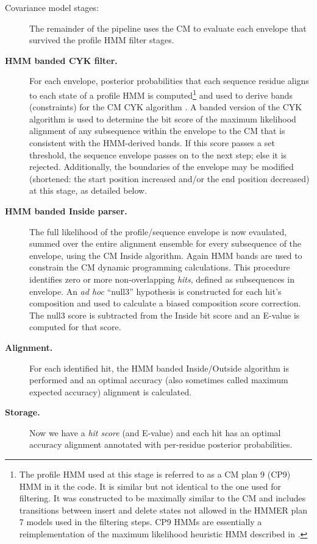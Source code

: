 \begin{description}
\begin{description}
\end{description}

\item[Covariance model stages:] The remainder of the pipeline uses the
  CM to evaluate each envelope that survived the profile HMM filter
  stages.

\item[\textbf{HMM banded CYK filter.}] For each envelope, posterior
  probabilities that each sequence residue aligns to each state of a
  profile HMM is computed\footnote{The profile HMM used at this stage
  is referred to as a CM plan 9 (CP9) HMM in it the code. It is
  similar but not identical to the one used for filtering. It was
  constructed to be maximally similar to the CM and includes
  transitions between insert and delete states not allowed in the
  HMMER plan 7 models used in the filtering steps. CP9 HMMs are
  essentially a reimplementation of the maximum likelihood heuristic
  HMM described in \cite{WeinbergRuzzo06}.} and used to derive bands
  (constraints) for the CM CYK algorithm \cite{Brown00,
  Nawrocki09}. A banded version of the CYK algorithm is used to
  determine the bit score of the maximum likelihood alignment of any
  subsequence within the envelope to the CM that is consistent with
  the HMM-derived bands. If this score passes a set threshold, the
  sequence envelope passes on to the next step; else it is rejected. 
  Additionally, the boundaries of the envelope may be modified
  (shortened: the start position increased and/or the end position
  decreased) at this stage, as detailed below.

\item[\textbf{HMM banded Inside parser.}] The full likelihood of the
  profile/sequence envelope is now evaulated, summed over the entire
  alignment ensemble for every subsequence of the envelope, using the
  CM Inside algorithm. Again HMM bands are used to constrain the
  CM dynamic programming calculations. This procedure identifies zero
  or more non-overlapping \emph{hits}, defined as subsequences in
  envelope. An \emph{ad hoc} ``null3'' hypothesis is constructed for
  each hit's composition and used to calculate a biased composition
  score correction. The null3 score is subtracted from the Inside bit
  score and an E-value is computed for that score.

\item[\textbf{Alignment.}] For each identified hit, the HMM banded
  Inside/Outside algorithm is performed and an optimal accuracy (also
  sometimes called maximum expected accuracy) alignment is
  calculated. 

\item[\textbf{Storage.}] Now we have a \emph{hit score} (and E-value)
  and each hit has an optimal accuracy alignment annotated with
  per-residue posterior probabilities.

\end{description}

